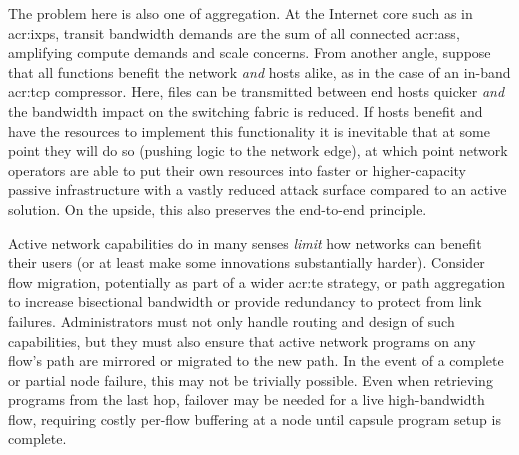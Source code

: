 The problem here is also one of aggregation.
At the Internet core such as in \glspl{acr:ixp}, transit bandwidth demands are the sum of all connected \glspl{acr:as}, amplifying compute demands and scale concerns.
From another angle, suppose that all functions benefit the network \emph{and} hosts alike, as in the case of an in-band \gls{acr:tcp} compressor.
Here, files can be transmitted between end hosts quicker \emph{and} the bandwidth impact on the switching fabric is reduced.
If hosts benefit and have the resources to implement this functionality it is inevitable that at some point they will do so (pushing logic to the network edge), at which point network operators are able to put their own resources into faster or higher-capacity passive infrastructure with a vastly reduced attack surface compared to an active solution. 
On the upside, this also preserves the end-to-end principle.



Active network capabilities do in many senses \emph{limit} how networks can benefit their users (or at least make some innovations substantially harder).
Consider flow migration, potentially as part of a wider \gls{acr:te} strategy, or path aggregation to increase bisectional bandwidth or provide redundancy to protect from link failures.
Administrators must not only handle routing and design of such capabilities, but they must also ensure that active network programs on any flow's path are mirrored or migrated to the new path.
In the event of a complete or partial node failure, this may not be trivially possible.
Even when retrieving programs from the last hop, failover may be needed for a live high-bandwidth flow, requiring costly per-flow buffering at a node until capsule program setup is complete.

